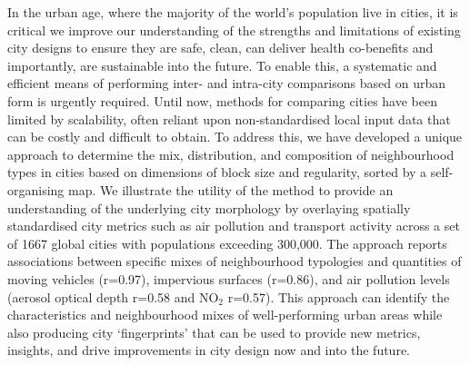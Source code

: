 In the urban age, where the majority of the world's population live in cities, it is critical we improve our understanding of the strengths and limitations of existing city designs to ensure they are safe, clean, can deliver health co-benefits and importantly, are sustainable into the future. To enable this, a systematic and efficient means of performing inter- and intra-city comparisons based on urban form is urgently required. Until now, methods for comparing cities have been limited by scalability, often reliant upon non-standardised local input data that can be costly and difficult to obtain. To address this, we have developed a unique approach to determine the mix, distribution, and composition of neighbourhood types in cities based on dimensions of block size and regularity, sorted by a self-organising map. We illustrate the utility of the method to provide an understanding of the underlying city morphology by overlaying spatially standardised city metrics such as air pollution and transport activity across a set of 1667 global cities with populations exceeding 300,000. The approach reports associations between specific mixes of neighbourhood typologies and quantities of moving vehicles (r=0.97), impervious surfaces (r=0.86), and air pollution levels (aerosol optical depth r=0.58 and NO$_{2}$ r=0.57). This approach can identify the characteristics and neighbourhood mixes of well-performing urban areas while also producing city `fingerprints' that can be used to provide new metrics, insights, and drive improvements in city design now and into the future.

